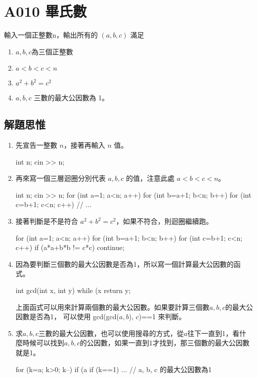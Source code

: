 \section{A010 畢氏數}
輸入一個正整數n，輸出所有的 $(a, b, c)$ 滿足
\begin{enumerate}
	\item $a, b, c$為三個正整數
	\item $a<b<c<n$
	\item $a^{2}+b^{2}=c^{2}$
	\item $a, b, c$ 三數的最大公因數為 1。
\end{enumerate}
\subsection{解題思惟}
\begin{enumerate}
	\item 
	先宣告一整數 $n$，接著再輸入 $n$ 值。
	\begin{inside}
		int n;
		cin >> n;
	\end{inside}
	\item
	再來寫一個三層迴圈分別代表 $a, b, c$ 的值，注意此處 $a<b<c<n$。
	\begin{inside}
	int n;
	cin >> n;
	for (int a=1; a<n; a++) {
		for (int b=a+1; b<n; b++) {
			for (int c=b+1; c<n; c++) {
				// ...
			}
		}
	}
	\end{inside}
	\item
	接著判斷是不是符合 $a^{2}+b^{2}=c^{2}$，如果不符合，則迴圈繼續跑。
	\begin{inside}
	for (int a=1; a<n; a++) {
		for (int b=a+1; b<n; b++) {
			for (int c=b+1; c<n; c++) {
				if (a*a+b*b != c*c) continue;	
			}
		}
	}
	\end{inside}
	\item 因為要判斷三個數的最大公因數是否為1，所以寫一個計算最大公因數的函式。
	\begin{inside}
	int gcd(int x, int y) {
		while (x%
		return y;				
	}
	\end{inside}
	上面函式可以用來計算兩個數的最大公因數。如果要計算三個數$a, b, c$的最大公因數是否為1，
	可以使用 gcd(gcd($a, b$), $c$)==1 來判斷。
	\item 求$a, b, c$三數的最大公因數，也可以使用搜尋的方式，從$a$往下一直到1，看什麼時候可以找到$a, b, c$的公因數，如果一直到1才找到，那三個數的最大公因數就是1。
	\begin{inside}
		for (k=a; k>0; k--) if (a%
		if (k==1) ... // a, b, c 的最大公因數為1
	\end{inside}
\end{enumerate} 

